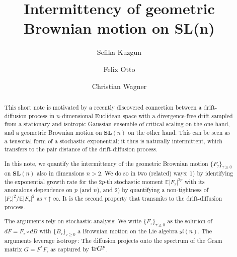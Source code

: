 \documentclass[english, letterpaper,12pt,reqno]{amsart}
\theoremstyle{remark}
\theoremstyle{plain}
\newcommand{\1}{\mathbf{1}}
\begin{document}
\title{Intermittency of geometric Brownian motion on \textbf{SL}(\lowercase{n}) }

\author[Sefika Kuzgun]{Sefika Kuzgun}
\author[Felix Otto]{Felix Otto}
\author[Christian Wagner]{Christian Wagner}

\address[Sefika Kuzgun]{Max Planck Institute for Mathematics in the Sciences,\newline
Inselstraße 22, 04103 Leipzig, Germany.}


\address[Felix Otto]{Max Planck Institute for Mathematics in the Sciences,\newline
Inselstraße 22, 04103 Leipzig, Germany.}

\address[Christian Wagner]{%
	Institute of Science and Technology Austria,\newline
	Am Campus 1,
	3400 Klosterneuburg, Austria.
}



\begin{abstract}

This short note is motivated by a recently discovered connection 
between a drift-diffusion process in $n$-dimensional Euclidean space
with a divergence-free drift sampled from 
a stationary and isotropic Gaussian ensemble of critical scaling on the one hand,
and a geometric Brownian motion on $\textbf{SL}(n)$ on the other hand.
This can be seen as a tensorial form of a stochastic exponential;
it thus is naturally intermittent, which transfers to the pair distance
of the drift-diffusion process.

\smallskip

In this note, we quantify the intermittency of the geometric Brownian motion $\{F_\tau\}_{\tau\ge0}$ 
on $\textbf{SL}(n)$ also in dimensions $n>2$. We do so in two (related) ways: 
1) by identifying the  
exponential growth rate for the $2p$-th stochastic moment $\mathbb{E}|F_\tau|^{2p}$
with its anomalous dependence on $p$ (and $n$), and 2) by quantifying a non-tightness of
$|F_\tau|^2/\mathbb{E}|F_\tau|^2$ as $\tau\uparrow\infty$. 
It is the second property that transmits to the drift-diffusion process.

\smallskip

The arguments rely on stochastic analysis: We write $\{F_\tau\}_{\tau\geq 0}$
as the solution of $dF=F_\tau\circ dB$ with $\{B_\tau\}_{\tau\geq 0}$ a Brownian motion
on the Lie algebra $\mathfrak{sl}(n)$. The arguments leverage isotropy:
The diffusion projects onto the spectrum of the Gram matrix $G=F^*F$,
as captured by ${\rm tr}G^p$. 

\end{abstract}
\maketitle
\end{document}

